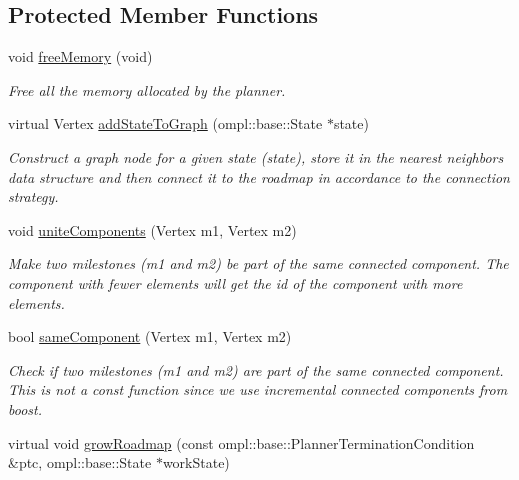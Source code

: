 \subsection*{\-Protected \-Member \-Functions}
\begin{DoxyCompactItemize}
\item 
\hypertarget{class_f_i_r_m_af6951ffec04529fd8da990978d7d8d19}{void \hyperlink{class_f_i_r_m_af6951ffec04529fd8da990978d7d8d19}{free\-Memory} (void)}\label{class_f_i_r_m_af6951ffec04529fd8da990978d7d8d19}

\begin{DoxyCompactList}\small\item\em \-Free all the memory allocated by the planner. \end{DoxyCompactList}\item 
\hypertarget{class_f_i_r_m_a052496dfed6f8d2a7526bb3dfa63a1ea}{virtual \-Vertex \hyperlink{class_f_i_r_m_a052496dfed6f8d2a7526bb3dfa63a1ea}{add\-State\-To\-Graph} (ompl\-::base\-::\-State $\ast$state)}\label{class_f_i_r_m_a052496dfed6f8d2a7526bb3dfa63a1ea}

\begin{DoxyCompactList}\small\item\em \-Construct a graph node for a given state ({\itshape state\/}), store it in the nearest neighbors data structure and then connect it to the roadmap in accordance to the connection strategy. \end{DoxyCompactList}\item 
\hypertarget{class_f_i_r_m_a34535f25e4f3fb645fb65d57e3faf01b}{void \hyperlink{class_f_i_r_m_a34535f25e4f3fb645fb65d57e3faf01b}{unite\-Components} (\-Vertex m1, \-Vertex m2)}\label{class_f_i_r_m_a34535f25e4f3fb645fb65d57e3faf01b}

\begin{DoxyCompactList}\small\item\em \-Make two milestones ({\itshape m1\/} and {\itshape m2\/}) be part of the same connected component. \-The component with fewer elements will get the id of the component with more elements. \end{DoxyCompactList}\item 
\hypertarget{class_f_i_r_m_a2045f113f0755ae8eeac2c35c7c08d41}{bool \hyperlink{class_f_i_r_m_a2045f113f0755ae8eeac2c35c7c08d41}{same\-Component} (\-Vertex m1, \-Vertex m2)}\label{class_f_i_r_m_a2045f113f0755ae8eeac2c35c7c08d41}

\begin{DoxyCompactList}\small\item\em \-Check if two milestones ({\itshape m1\/} and {\itshape m2\/}) are part of the same connected component. \-This is not a const function since we use incremental connected components from boost. \end{DoxyCompactList}\item 
\hypertarget{class_f_i_r_m_ae33b03b6c78466e4a47f7b6d9f59d7f8}{virtual void \hyperlink{class_f_i_r_m_ae33b03b6c78466e4a47f7b6d9f59d7f8}{grow\-Roadmap} (const ompl\-::base\-::\-Planner\-Termination\-Condition \&ptc, ompl\-::base\-::\-State $\ast$work\-State)}\label{class_f_i_r_m_ae33b03b6c78466e4a47f7b6d9f59d7f8}


\end{DoxyCompactItemize}
